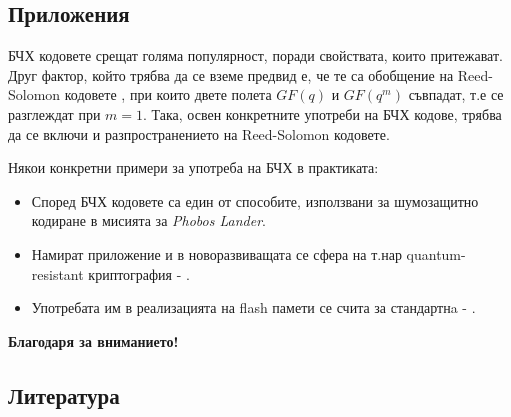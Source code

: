 \documentclass[numbering=fraction]{beamer}
\begin{document}
\begin{frame}
\end{frame}

\begin{frame}
\section{Приложения}
БЧХ кодовете срещат голяма популярност, поради свойствата, които притежават.
Друг фактор, който трябва да се вземе предвид е, че те са обобщение на
Reed-Solomon кодовете \autocite{reed1960}, при които двете полета $GF(q)$ и $GF(q^m)$
съвпадат, т.е се разглеждат при $m = 1$. Така, освен конкретните употреби на БЧХ
кодове, трябва да се включи и разпространението на Reed-Solomon кодовете. \\
\end{frame}

\begin{frame}
Някои конкретни примери за употреба на БЧХ в практиката:
\begin{itemize}
\item Според \autocite{cheung1988} БЧХ кодовете са един от способите, използвани за
шумозащитно кодиране в мисията за \textit{Phobos Lander}.
\item Намират приложение и в новоразвиващата се сфера на т.нар quantum-resistant
криптография - \autocite{melchor2020}.
\item Употребата им в реализацията на flash памети се счита за стандартнa -
\autocite{marelli2018}.
\end{itemize}
\end{frame}

\begin{frame}[plain]
\centering
\Large{\textbf{Благодаря за вниманието!}}
\end{frame}

\begin{frame}[plain]
    \section{Литература}
\end{frame}

\begin{frame}
\nocite{*}
\printbibliography[heading=none]
\end{frame}
\end{document}
